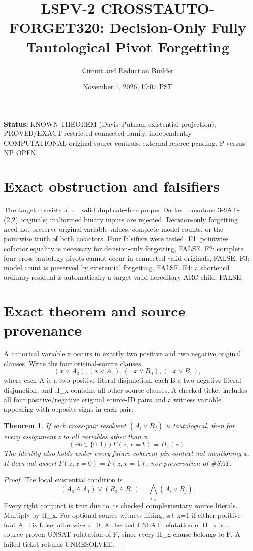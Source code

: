 \documentclass[11pt]{article}
\title{LSPV-2 CROSSTAUTO-FORGET320: Decision-Only Fully Tautological Pivot Forgetting}
\author{Circuit and Reduction Builder}
\date{November 1, 2026, 19:07 PST}
\newtheorem{theorem}{Theorem}
\begin{document}
\maketitle
\noindent\textbf{Status:} KNOWN THEOREM (Davis--Putnam existential projection), PROVED/EXACT restricted connected family, independently COMPUTATIONAL original-source controls, external referee pending. P versus NP OPEN.
\section{Exact obstruction and falsifiers}
The target consists of all valid duplicate-free proper D\"ocker monotone 3-SAT-(2,2) originals; malformed binary inputs are rejected. Decision-only forgetting need not preserve original variable values, complete model counts, or the pointwise truth of both cofactors. Four falsifiers were tested. F1: pointwise cofactor equality is necessary for decision-only forgetting, FALSE. F2: complete four-cross-tautology pivots cannot occur in connected valid originals, FALSE. F3: model count is preserved by existential forgetting, FALSE. F4: a shortened ordinary residual is automatically a target-valid hereditary ARC child, FALSE.
\section{Exact theorem and source provenance}
A canonical variable x occurs in exactly two positive and two negative original clauses. Write the four original-source clauses
\[
(x\vee A_0),(x\vee A_1),(\neg x\vee B_0),(\neg x\vee B_1),
\]
where each A is a two-positive-literal disjunction, each B a two-negative-literal disjunction, and H_x contains all other source clauses. A checked ticket includes all four positive/negative original source-ID pairs and a witness variable appearing with opposite signs in each pair.
\begin{theorem}
If each cross-pair resolvent $(A_i\vee B_j)$ is tautological, then for every assignment z to all variables other than x,
\[
\boxed{(\exists b\in\{0,1\})F(z,x=b)=H_x(z).}
\]
The identity also holds under every future coherent pin context not mentioning x. It does not assert $F(z,x=0)=F(z,x=1)$, nor preservation of \#SAT.
\end{theorem}
\begin{proof}
The local existential condition is
\[
(A_0\wedge A_1)\vee(B_0\wedge B_1)
=\bigwedge_{i,j}(A_i\vee B_j).
\]
Every right conjunct is true due to its checked complementary source literals. Multiply by H_x. For optional source witness lifting, set x=1 if either positive foot A_i is false, otherwise x=0. A checked UNSAT refutation of H_x is a source-proven UNSAT refutation of F, since every H_x clause belongs to F. A failed ticket returns UNRESOLVED.
\end{proof}
\end{document}

